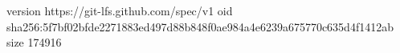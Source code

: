 version https://git-lfs.github.com/spec/v1
oid sha256:5f7bf02bfde2271883ed497d88b848f0ae984a4e6239a675770c635d4f1412ab
size 174916
